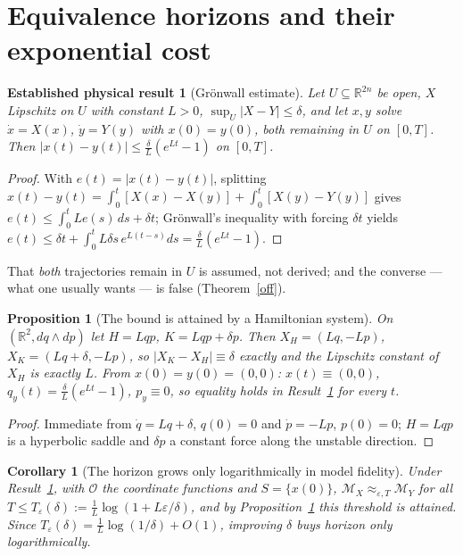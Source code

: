 \documentclass[12pt,a4paper]{article}
\theoremstyle{definition}
\theoremstyle{plain}
\newtheorem{proposition}[definition]{Proposition}
\newtheorem{corollary}[definition]{Corollary}
\theoremstyle{commentary}
\newtheorem{established}[definition]{Established physical result}
\newcommand{\R}{\mathbb{R}}
\newcommand{\Oc}{\mathcal{O}}
\newcommand{\Mc}{\mathcal{M}}
\newcommand{\eps}{\varepsilon}
\begin{document}
\section{Equivalence horizons and their exponential cost}
\label{s4}

\begin{established}[Gr\"onwall estimate]
\label{gron}
Let $U\subseteq\R^{2n}$ be open, $X$ Lipschitz on $U$ with constant $L>0$, $\sup_U|X-Y|\le\delta$, and let $x,y$ solve $\dot x=X(x)$, $\dot y=Y(y)$ with $x(0)=y(0)$, both remaining in $U$ on $[0,T]$. Then $|x(t)-y(t)|\le\frac{\delta}{L}(e^{Lt}-1)$ on $[0,T]$.
\end{established}

\begin{proof}
With $e(t)=|x(t)-y(t)|$, splitting $x(t)-y(t)=\int_0^t[X(x)-X(y)]+\int_0^t[X(y)-Y(y)]$ gives $e(t)\le\int_0^tLe(s)\,ds+\delta t$; Gr\"onwall's inequality \cite{Gronwall1919} with forcing $\delta t$ yields $e(t)\le\delta t+\int_0^tL\delta s\,e^{L(t-s)}ds=\frac{\delta}{L}(e^{Lt}-1)$.
\end{proof}

That \emph{both} trajectories remain in $U$ is assumed, not derived; and the converse --- what one usually wants --- is false (Theorem~\ref{off}).

\begin{proposition}[The bound is attained by a Hamiltonian system]
\label{shp}
On $(\R^2,dq\wedge dp)$ let $H=Lqp$, $K=Lqp+\delta p$. Then $X_H=(Lq,-Lp)$, $X_K=(Lq+\delta,-Lp)$, so $|X_K-X_H|\equiv\delta$ exactly and the Lipschitz constant of $X_H$ is exactly $L$. From $x(0)=y(0)=(0,0)$: $x(t)\equiv(0,0)$, $q_y(t)=\frac{\delta}{L}(e^{Lt}-1)$, $p_y\equiv0$, so equality holds in Result~\ref{gron} for every $t$.
\end{proposition}

\begin{proof}
Immediate from $\dot q=Lq+\delta$, $q(0)=0$ and $\dot p=-Lp$, $p(0)=0$; $H=Lqp$ is a hyperbolic saddle and $\delta p$ a constant force along the unstable direction.
\end{proof}

\begin{corollary}[The horizon grows only logarithmically in model fidelity]
\label{hor}
Under Result~\ref{gron}, with $\Oc$ the coordinate functions and $S=\{x(0)\}$, $\Mc_X\approx_{\eps,T}\Mc_Y$ for all $T\le T_\eps(\delta):=\frac1L\log(1+L\eps/\delta)$, and by Proposition~\ref{shp} this threshold is attained. Since $T_\eps(\delta)=\frac1L\log(1/\delta)+O(1)$, improving $\delta$ buys horizon only logarithmically.
\end{corollary}
\end{document}
